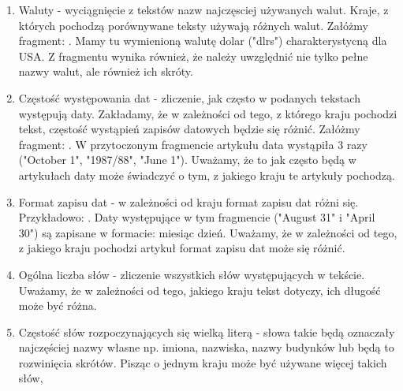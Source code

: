 \documentclass{classrep}
\begin{document}
\begin{enumerate}
    \item Waluty - wyciągnięcie z tekstów nazw najczęsciej używanych walut. Kraje, z których pochodzą porównywane teksty używają różnych walut. Załóżmy fragment: . Mamy tu wymienioną walutę dolar ("dlrs") charakterystycną dla USA. Z fragmentu wynika również, że należy uwzględnić nie tylko pełne nazwy walut, ale również ich skróty.
    \item Częstość występowania dat - zliczenie, jak często w podanych tekstach występują daty. Zakładamy, że w zależności od tego, z którego kraju pochodzi tekst, częstość wystąpień zapisów datowych będzie się różnić. Załóżmy fragment: . W przytoczonym fragmencie artykułu data wystąpiła 3 razy ("October 1", "1987/88", "June 1"). Uważamy, że to jak często będą w artykułach daty może świadczyć o tym, z jakiego kraju te artykuły pochodzą.
    \item Format zapisu dat - w zależności od kraju format zapisu dat różni się. Przykładowo: . Daty występujące w tym fragmencie ("August 31" i "April 30") są zapisane w formacie: miesiąc dzień. Uważamy, że w zależności od tego, z jakiego kraju pochodzi artykuł format zapisu dat może się różnić.
    \item Ogólna liczba słów - zliczenie wszystkich słów występujących w tekście. Uważamy, że w zależności od tego, jakiego kraju tekst dotyczy, ich długość może być różna.
    \item Częstość słów rozpoczynających się wielką literą - słowa takie będą oznaczały najczęściej  nazwy własne np. imiona, nazwiska, nazwy budynków lub będą to rozwinięcia skrótów. Pisząc o jednym kraju może być używane więcej takich słów, 

\end{enumerate}
\end{document}
